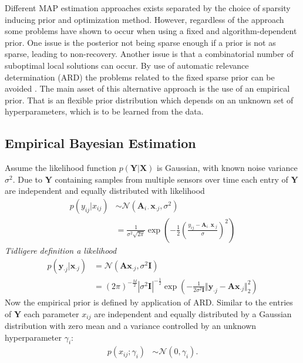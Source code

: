 Different MAP estimation approaches exists separated by the choice of sparsity inducing prior and optimization method. 
However, regardless of the approach some problems have shown to occur when using a fixed and algorithm-dependent prior. 
One issue is the posterior not being sparse enough if a prior is not as sparse, leading to non-recovery. 
Another issue is that a combinatorial number of suboptimal local solutions can occur.
By use of automatic relevance determination (ARD) the problems related to the fixed sparse prior can be avoided \cite[p. 20]{phd_wipf}. 
The main asset of this alternative approach is the use of an empirical prior. 
That is an flexible prior distribution which depends on an unknown set of hyperparameters, which is to be learned from the data.
 
\subsection{Empirical Bayesian Estimation}\label{seg:EBE}
Assume the likelihood function $p(\mathbf{Y} \vert \mathbf{X})$ is Gaussian, with known noise variance $\sigma^2$.
Due to $\textbf{Y}$ containing samples from multiple sensors over time each entry of $\textbf{Y}$ are independent and equally distributed with likelihood
\begin{align*}
p(y_{ij}\vert x_{ij}) &\sim \mathcal{N}(\mathbf{A}_{i \cdot}\textbf{x}_{\cdot j}, \sigma^2) \\
& = \frac{1}{\sigma^2\sqrt{2\pi}}\exp\left( -\frac{1}{2}\left( \frac{y_{ij}- \mathbf{A}_{i \cdot}\textbf{x}_{\cdot j}}{\sigma}\right)^{2}\right)
\end{align*}
\textit{Tidligere definition a likelihood}
\begin{align*}
p(\mathbf{y}_{\cdot j} \vert \mathbf{x}_{\cdot j}) &= \mathcal{N}(\mathbf{Ax}_{\cdot j}, \sigma^2 \mathbf{I}) \\
 &= (2 \pi)^{-\frac{M}{2}}|\sigma^2\mathbf{I}|^{-\frac{1}{2}}\exp \left( -\frac{1}{2 \sigma^2\mathbf{I}} \Vert \mathbf{y}_{\cdot j} - \mathbf{A} \mathbf{x}_{\cdot j} \Vert_2^2 \right)
\end{align*}
Now the empirical prior is defined by application of ARD. Similar to the entries of $\textbf{Y}$ each parameter $x_{ij}$ are independent and equally distributed by a Gaussian distribution with zero mean and a variance controlled by an unknown hyperparameter $\gamma_i$:
\begin{align*}
p (x_{i j} ; \gamma_i) &\sim \mathcal{N}(0, \gamma_i).
\end{align*}
